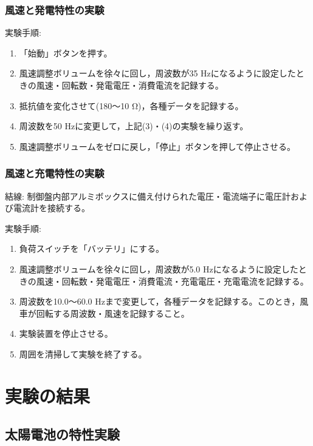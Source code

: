 \documentclass[a4paper,11pt,xelatex,ja=standard]{bxjsarticle}
\begin{document}
        \subsubsection{風速と発電特性の実験}
            実験手順:
            \begin{enumerate}
                \item 「始動」ボタンを押す。
                \item 風速調整ボリュームを徐々に回し，周波数が35 Hzになるように設定したときの風速・回転数・発電電圧・消費電流を記録する。
                \item 抵抗値を変化させて(180～10 Ω)，各種データを記録する。
                \item 周波数を50 Hzに変更して，上記(3)・(4)の実験を繰り返す。
                \item 風速調整ボリュームをゼロに戻し，「停止」ボタンを押して停止させる。
            \end{enumerate}
    
        \subsubsection{風速と充電特性の実験}
            結線: 制御盤内部アルミボックスに備え付けられた電圧・電流端子に電圧計および電流計を接続する。
    
            実験手順:
            \begin{enumerate}
                \item 負荷スイッチを「バッテリ」にする。
                \item 風速調整ボリュームを徐々に回し，周波数が5.0 Hzになるように設定したときの風速・回転数・発電電圧・消費電流・充電電圧・充電電流を記録する。
                \item 周波数を10.0～60.0 Hzまで変更して，各種データを記録する。このとき，風車が回転する周波数・風速を記録すること。
                \item 実験装置を停止させる。
                \item 周囲を清掃して実験を終了する。
            \end{enumerate}

\section{実験の結果}
    \subsection{太陽電池の特性実験}
\end{document}
